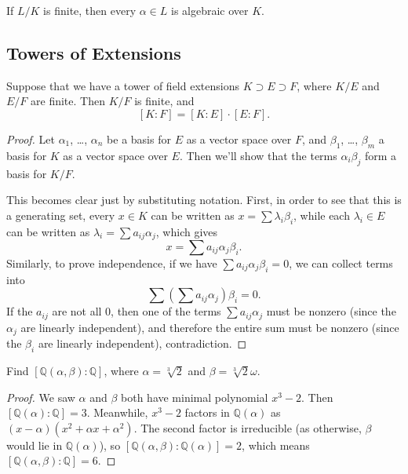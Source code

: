 \begin{corollary}
    If $L/K$ is finite, then every $\alpha \in L$ is algebraic over $K$. 
\end{corollary}

\subsection{Towers of Extensions}

\vspace{0.75em}

\begin{proposition} \label{tower}
    Suppose that we have a tower of field extensions $K \supset E \supset F$, where $K/E$ and $E/F$ are finite. Then $K/F$ is finite, and \[[K : F] = [K : E] \cdot [E : F].\] 
\end{proposition}

\begin{proof}
    Let $\alpha_1$, \ldots, $\alpha_n$ be a basis for $E$ as a vector space over $F$, and $\beta_1$, \ldots, $\beta_m$ a basis for $K$ as a vector space over $E$. Then we'll show that the terms $\alpha_i\beta_j$ form a basis for $K/F$. 

    This becomes clear just by substituting notation. First, in order to see that this is a generating set, every $x \in K$ can be written as $x = \sum \lambda_i\beta_i$, while each $\lambda_i \in E$ can be written as $\lambda_i = \sum a_{ij}\alpha_j$, which gives \[x = \sum a_{ij}\alpha_j\beta_i.\] Similarly, to prove independence, if we have $\sum a_{ij}\alpha_j\beta_i = 0$, we can collect terms into \[\sum \left(\sum a_{ij}\alpha_j\right)\beta_i = 0.\] If the $a_{ij}$ are not all $0$, then one of the terms $\sum a_{ij}\alpha_j$ must be nonzero (since the $\alpha_j$ are linearly independent), and therefore the entire sum must be nonzero (since the $\beta_i$ are linearly independent), contradiction. 
\end{proof}

\begin{example}
    Find $[\mathbb{Q}(\alpha, \beta) : \mathbb{Q}]$, where $\alpha = \sqrt[3]{2}$ and $\beta = \sqrt[3]{2}\omega$. 
\end{example}

\begin{proof}
    We saw $\alpha$ and $\beta$ both have minimal polynomial $x^3 - 2$. Then $[\mathbb{Q}(\alpha) : \mathbb{Q}] = 3$. Meanwhile, $x^3 - 2$ factors in $\mathbb{Q}(\alpha)$ as $(x - \alpha)(x^2 + \alpha x + \alpha^2)$. The second factor is irreducible (as otherwise, $\beta$ would lie in $\mathbb{Q}(\alpha)$), so $[\mathbb{Q}(\alpha, \beta) : \mathbb{Q}(\alpha)] = 2$, which means $[\mathbb{Q}(\alpha, \beta) : \mathbb{Q}] = 6$. 
\end{proof}


